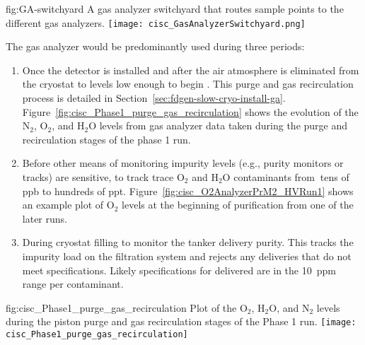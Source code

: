 \begin{dunefigure}{fig:GA-switchyard}
  {A gas analyzer switchyard that routes sample points to the different gas analyzers.}
  \texttt{[image: cisc\_GasAnalyzerSwitchyard.png]}
\end{dunefigure}

The gas analyzer would be predominantly used during three periods: 


\begin{enumerate}
\item Once the detector is installed and after the air atmosphere is eliminated from the cryostat to levels low enough to begin \cooldown. This purge and gas recirculation process is detailed in Section~\ref{sec:fdgen-slow-cryo-install-ga}. Figure~\ref{fig:cisc_Phase1_purge_gas_recirculation} shows the evolution of the $\text{N}_2$, $\text{O}_2$, and $\text{H}_2\text{O}$ levels from gas analyzer data taken during the purge and recirculation stages of the   %
phase 1 run.


\item Before other means of monitoring impurity levels (e.g., purity monitors or  tracks) are sensitive, to track trace $\text{O}_2$ and $\text{H}_2\text{O}$ contaminants from $\>$tens of ppb to hundreds of ppt.  Figure~\ref{fig:cisc_O2AnalyzerPrM2_HVRun1} shows an example plot of $\text{O}_2$ levels at the beginning of \lar purification from one of the later   runs.

\item During cryostat filling to monitor the tanker \lar delivery purity. This tracks the impurity load on the filtration system and rejects any deliveries that do not meet specifications. Likely specifications for delivered \lar are in the \SI{10}{ppm} range per contaminant.


\end{enumerate}

\begin{dunefigure}{fig:cisc_Phase1_purge_gas_recirculation}
  {Plot of the $\text{O}_2$, $\text{H}_2\text{O}$, and $\text{N}_2$ levels during the piston purge and gas recirculation stages of the  Phase 1 run.}
  \texttt{[image: cisc\_Phase1\_purge\_gas\_recirculation]}
\end{dunefigure}

